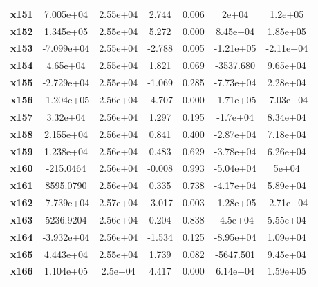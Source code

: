 \documentclass{article}
\begin{document}
\begin{center}
{\begin{tabular}{lcccccc}
\textbf{x151}  &    7.005e+04  &     2.55e+04     &     2.744  &         0.006        &        2e+04    &      1.2e+05     \\
\textbf{x152}  &    1.345e+05  &     2.55e+04     &     5.272  &         0.000        &     8.45e+04    &     1.85e+05     \\
\textbf{x153}  &   -7.099e+04  &     2.55e+04     &    -2.788  &         0.005        &    -1.21e+05    &    -2.11e+04     \\
\textbf{x154}  &     4.65e+04  &     2.55e+04     &     1.821  &         0.069        &    -3537.680    &     9.65e+04     \\
\textbf{x155}  &   -2.729e+04  &     2.55e+04     &    -1.069  &         0.285        &    -7.73e+04    &     2.28e+04     \\
\textbf{x156}  &   -1.204e+05  &     2.56e+04     &    -4.707  &         0.000        &    -1.71e+05    &    -7.03e+04     \\
\textbf{x157}  &     3.32e+04  &     2.56e+04     &     1.297  &         0.195        &     -1.7e+04    &     8.34e+04     \\
\textbf{x158}  &    2.155e+04  &     2.56e+04     &     0.841  &         0.400        &    -2.87e+04    &     7.18e+04     \\
\textbf{x159}  &    1.238e+04  &     2.56e+04     &     0.483  &         0.629        &    -3.78e+04    &     6.26e+04     \\
\textbf{x160}  &    -215.0464  &     2.56e+04     &    -0.008  &         0.993        &    -5.04e+04    &        5e+04     \\
\textbf{x161}  &    8595.0790  &     2.56e+04     &     0.335  &         0.738        &    -4.17e+04    &     5.89e+04     \\
\textbf{x162}  &   -7.739e+04  &     2.57e+04     &    -3.017  &         0.003        &    -1.28e+05    &    -2.71e+04     \\
\textbf{x163}  &    5236.9204  &     2.56e+04     &     0.204  &         0.838        &     -4.5e+04    &     5.55e+04     \\
\textbf{x164}  &   -3.932e+04  &     2.56e+04     &    -1.534  &         0.125        &    -8.95e+04    &     1.09e+04     \\
\textbf{x165}  &    4.443e+04  &     2.55e+04     &     1.739  &         0.082        &    -5647.501    &     9.45e+04     \\
\textbf{x166}  &    1.104e+05  &      2.5e+04     &     4.417  &         0.000        &     6.14e+04    &     1.59e+05     \\

\end{tabular}}
\end{center}
\end{document}
